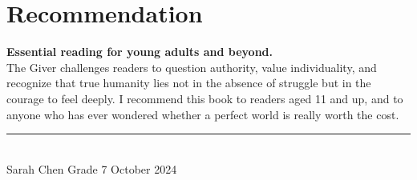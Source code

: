 \section{Recommendation}

{\large\bfseries\color{accent}Essential reading for young adults and beyond.}\\ The Giver challenges readers to question authority, value individuality, and recognize that true humanity lies not in the absence of struggle but in the courage to feel deeply. I recommend this book to readers aged 11 and up, and to anyone who has ever wondered whether a perfect world is really worth the cost.

\vspace{8pt}
\begin{flushright}
{\color{accent}\rule{0.3\textwidth}{0.5pt}}\\[2pt]
{\small\color{accentlight}Sarah Chen \quad\textbullet\quad Grade 7 \quad\textbullet\quad October 2024}
\end{flushright}
